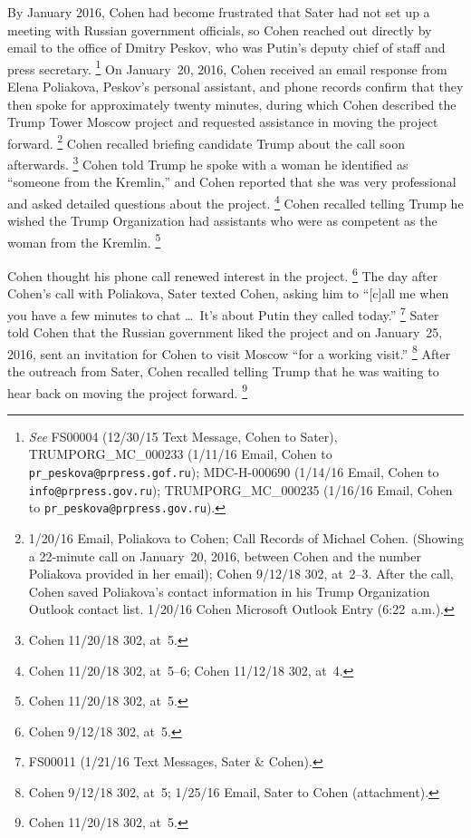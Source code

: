 By January 2016, Cohen had become frustrated that Sater had not set up a meeting with Russian government officials, so Cohen reached out directly by email to the office of Dmitry Peskov, who was Putin's deputy chief of staff and press secretary.%
\footnote{\textit{See} FS00004 (12/30/15 Text Message, Cohen to Sater), TRUMPORG\_MC\_000233 (1/11/16 Email, Cohen to \verb+pr_peskova@prpress.gof.ru+);
MDC-H-000690 (1/14/16 Email, Cohen to \verb+info@prpress.gov.ru+);
TRUMPORG\_MC\_000235 (1/16/16 Email, Cohen to \verb+pr_peskova@prpress.gov.ru+).}
On January~20, 2016, Cohen received an email response from Elena Poliakova, Peskov's personal assistant, and phone records confirm that they then spoke for approximately twenty minutes, during which Cohen described the Trump Tower Moscow project and requested assistance in moving the project forward.%
\footnote{1/20/16 Email, Poliakova to Cohen;
Call Records of Michael Cohen.
(Showing a 22-minute call on January~20, 2016, between Cohen and the number Poliakova provided in her email);
Cohen 9/12/18 302, at~2--3.
After the call, Cohen saved Poliakova's contact information in his Trump Organization Outlook contact list.
1/20/16 Cohen Microsoft Outlook Entry (6:22~a.m.).}
Cohen recalled briefing candidate Trump about the call soon afterwards.%
\footnote{Cohen 11/20/18 302, at~5.}
Cohen told Trump he spoke with a woman he identified as ``someone from the Kremlin,'' and Cohen reported that she was very professional and asked detailed questions about the project.%
\footnote{Cohen 11/20/18 302, at~5--6;
Cohen 11/12/18 302, at~4.}
Cohen recalled telling Trump he wished the Trump Organization had assistants who were as competent as the woman from the Kremlin.%
\footnote{Cohen 11/20/18 302, at~5.}

Cohen thought his phone call renewed interest in the project.%
\footnote{Cohen 9/12/18 302, at~5.}
The day after Cohen's call with Poliakova, Sater texted Cohen, asking him to ``[c]all me when you have a few minutes to chat \dots\ It's about Putin they called today.''%
\footnote{FS00011 (1/21/16 Text Messages, Sater \& Cohen).}
Sater told Cohen that the Russian government liked the project and on January~25, 2016, sent an invitation for Cohen to visit Moscow ``for a working visit.''%
\footnote{Cohen 9/12/18 302, at~5;
1/25/16 Email, Sater to Cohen (attachment).}
After the outreach from Sater, Cohen recalled telling Trump that he was waiting to hear back on moving the project forward.%
\footnote{Cohen 11/20/18 302, at~5.}

